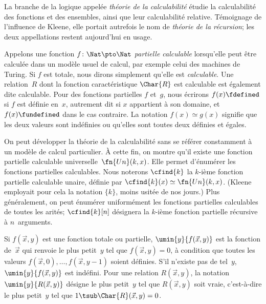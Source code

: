 \documentclass[../../../include/open-logic-section]{subfiles}
\begin{document}

La branche de la logique appelée \emph{théorie de la calculabilité}
étudie la calculabilité des fonctions et des ensembles, ainsi que
leur calculabilité relative. Témoignage de l'influence de Kleene,
elle portait autrefois le nom de \emph{théorie de la récursion};
les deux appellations restent aujourd'hui en usage.

Appelons une fonction $f\colon\Nat\pto\Nat$
\emph{partielle calculable} lorsqu'elle peut être calculée
dans un modèle usuel de calcul, par exemple celui des machines de Turing. Si $f$ est totale, nous dirons
simplement qu'elle est \emph{calculable}. Une relation~$R$
dont la fonction caractéristique $\Char{R}$ est calculable
est également dite calculable. Pour des fonctions partielles
$f$ et~$g$, nous écrirons $f(x) \fdefined$ si $f$ est
définie en~$x$, autrement dit si $x$ appartient à son
domaine, et $f(x) \fundefined$ dans le cas contraire.
La notation $f(x) \simeq g(x)$ signifie que les deux
valeurs sont indéfinies ou qu'elles sont toutes deux
définies et égales.

On peut développer la théorie de la calculabilité sans
se référer constamment à un modèle de calcul particulier.
À cette fin, on montre qu'il existe une fonction partielle
calculable universelle~$\fn{Un}(k,x)$. Elle permet
d'énumérer les fonctions partielles calculables. Nous
noterons $\cfind{k}$ la $k$-ième fonction partielle
calculable unaire, définie par
$\cfind{k}(x) \simeq \fn{Un}(k,x)$. (Kleene employait
pour cela la notation $\{ k \}$, moins usitée de nos
jours.) Plus généralement, on peut énumérer uniformément
les fonctions partielles calculables de toutes les arités;
$\cfind{k}[n]$ désignera la $k$-ième fonction partielle
récursive à $n$~arguments.

Si $f(\vec x,y)$ est une fonction totale ou partielle,
$\umin{y}{f (\vec x,y)}$ est la fonction de~$\vec x$
qui renvoie le plus petit~$y$ tel que $f(\vec x,y)=0$,
à condition que toutes les valeurs $f(\vec x,0),\dots,
f(\vec x,y-1)$ soient définies. S'il n'existe pas de
tel~$y$, $\umin{y}{f (\vec x,y)}$ est indéfini.
Pour une relation $R(\vec x,y)$, la notation
$\umin{y}{R(\vec x,y)}$ désigne le plus petit~$y$
tel que $R(\vec x,y)$ soit vraie, c'est-à-dire le
plus petit~$y$ tel que
$1 \tsub \Char{R}(\vec x,y)=0$.
\end{document}
